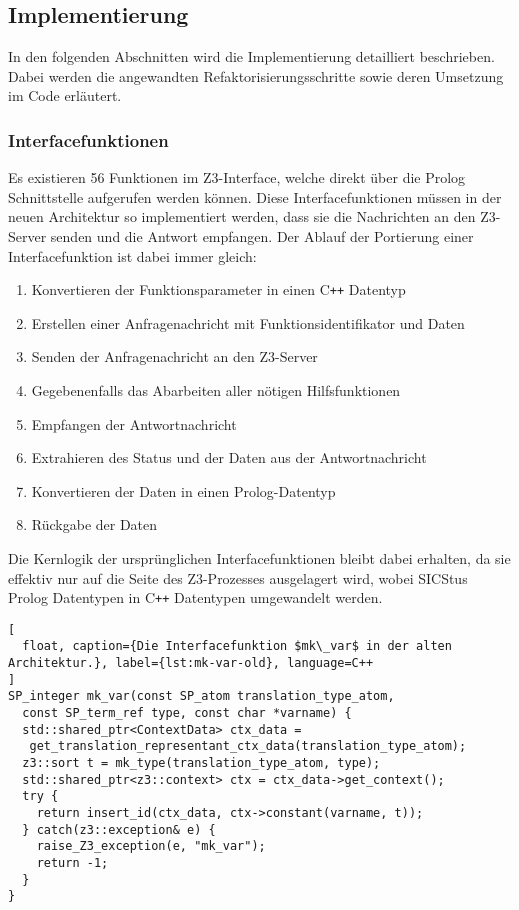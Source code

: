 \subsection{Implementierung}

In den folgenden Abschnitten wird die Implementierung detailliert beschrieben.
Dabei werden die angewandten Refaktorisierungsschritte sowie deren Umsetzung im Code erläutert.

\subsubsection{Interfacefunktionen}

Es existieren 56 Funktionen im Z3-Interface, welche direkt über die Prolog Schnittstelle aufgerufen werden können.
Diese Interfacefunktionen müssen in der neuen Architektur so implementiert werden, dass sie die Nachrichten an den Z3-Server senden und die Antwort empfangen.
Der Ablauf der Portierung einer Interfacefunktion ist dabei immer gleich:

\begin{enumerate}
  \item Konvertieren der Funktionsparameter in einen C\texttt{++} Datentyp
  \item Erstellen einer Anfragenachricht mit Funktionsidentifikator und Daten
  \item Senden der Anfragenachricht an den Z3-Server
  \item Gegebenenfalls das Abarbeiten aller nötigen Hilfsfunktionen
  \item Empfangen der Antwortnachricht
  \item Extrahieren des Status und der Daten aus der Antwortnachricht
  \item Konvertieren der Daten in einen Prolog-Datentyp
  \item Rückgabe der Daten
\end{enumerate}

Die Kernlogik der ursprünglichen Interfacefunktionen bleibt dabei erhalten, da sie effektiv nur auf die Seite des Z3-Prozesses ausgelagert wird,
wobei SICStus Prolog Datentypen in C\texttt{++} Datentypen umgewandelt werden.

\begin{lstlisting}[
  float, caption={Die Interfacefunktion $mk\_var$ in der alten Architektur.}, label={lst:mk-var-old}, language=C++
]
SP_integer mk_var(const SP_atom translation_type_atom,
  const SP_term_ref type, const char *varname) {
  std::shared_ptr<ContextData> ctx_data = 
   get_translation_representant_ctx_data(translation_type_atom);
  z3::sort t = mk_type(translation_type_atom, type);
  std::shared_ptr<z3::context> ctx = ctx_data->get_context();
  try {
    return insert_id(ctx_data, ctx->constant(varname, t));
  } catch(z3::exception& e) {
    raise_Z3_exception(e, "mk_var");
    return -1;
  }
}
\end{lstlisting}

